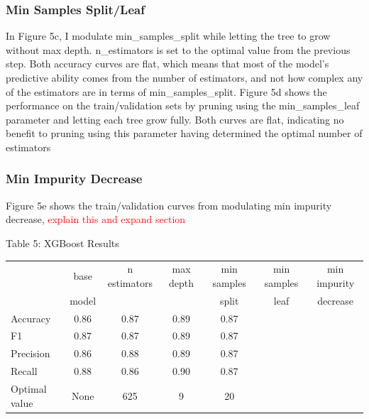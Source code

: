 \documentclass{article}
\newcommand\todo[1]{\textcolor{red}{#1}}
\begin{document}
\subsubsection*{Min Samples Split/Leaf}
In Figure 5c, I modulate min\_samples\_split while letting the tree to grow without max depth. n\_estimators is set to the optimal value from the previous step. Both accuracy curves are flat, which means that most of the model's predictive ability comes from the number of estimators, and not how complex any of the estimators are in terms of min\_samples\_split. Figure 5d shows the performance on the train/validation sets by pruning using the min\_samples\_leaf parameter and letting each tree grow fully. Both curves are flat, indicating no benefit to pruning using this parameter having determined the optimal number of estimators

\subsubsection*{Min Impurity Decrease}
Figure 5e shows the train/validation curves from modulating min impurity decrease, \todo{explain this and expand section}

\begin{table}
	
	\centering
	Table 5: XGBoost Results \\
	\begin{tabular}{ l c c c c c c }
		\hline
		& base & n estimators & max depth & min samples & min samples & min impurity\\
		& model & & & split & leaf & decrease \\
		\hline
		Accuracy & 0.86 & 0.87 & 0.89 & 0.87 && \\
		F1 & 0.87 & 0.87 & 0.89 & 0.87 & &\\
		Precision & 0.86 & 0.88 & 0.89 & 0.87 && \\
		Recall & 0.88 & 0.86 & 0.90 & 0.87 && \\
		Optimal value & None & 625 & 9 & 20 & & \\

		
		\hline 
	\end{tabular}
\end{table}
\end{document}
